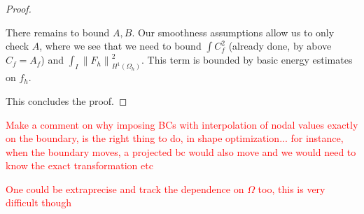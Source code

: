 \documentclass[english,a4paper,10pt,oneside]{scrbook}	%
\theoremstyle{break}
\newenvironment{mproof}[1][\proofname]{%
  \begin{proof}[#1]$ $\par\nobreak\ignorespaces
}{%
  \end{proof}
}
\renewcommand*{\proofname}{Proof}
\theoremstyle{remark}
\newcommand{\ds}{\displaystyle}
\newcommand{\norm}[1]{\left\lVert#1\right\rVert}
\begin{document}
\begin{mproof}
There remains to bound $A, B$. Our smoothness assumptions allow us to only check $A$, where we see that we need to bound $\ds \int C_f^2$ (already done, by above $C_f=A_f$) and $\ds \int_I \norm{F_h}_{H^1(\Omega_h)}^2$. This term is bounded by basic energy estimates on $f_h$.

This concludes the proof.

\end{mproof}

\textcolor{red}{Make a comment on why imposing BCs with interpolation of nodal values exactly on the boundary, is the right thing to do, in shape optimization... for instance, when the boundary moves, a projected bc would also move and we would need to know the exact transformation etc}

\textcolor{red}{One could be extraprecise and track the dependence on $\Omega$ too, this is very difficult though}

\printbibliography[title={Bibliography}]

\end{document}
